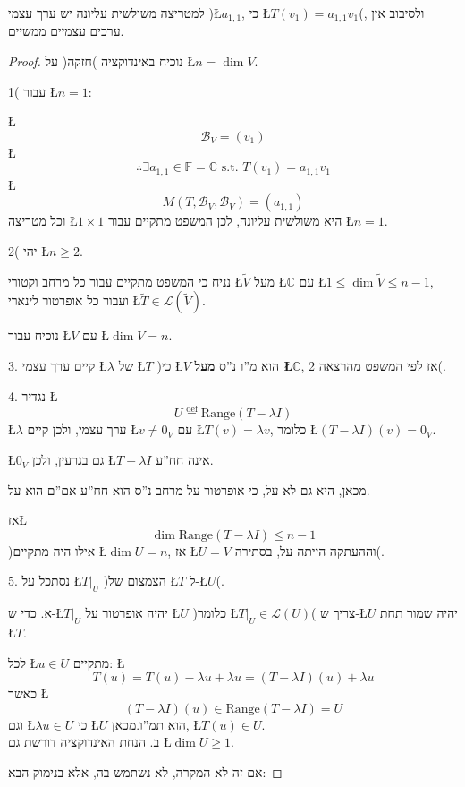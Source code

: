 \documentclass[english,hebrew]{article}
\begin{document}
למטריצה משולשית עליונה יש ערך עצמי )\L{$a_{1,1}$}, כי \L{$T(v_{1})=a_{1,1}v_{1}$}(,
ולסיבוב אין ערכים עצמיים ממשיים.
\begin{proof}
נוכיח באינדוקציה )חזקה( על \L{$n=\dim V$}.

1( עבור \L{$n=1$}:

\L{%
\[
\mathcal{B}_{V}=\left(v_{1}\right)
\]
}%
\L{%
\[
\therefore\exists a_{1,1}\in\mathbb{F}=\mathbb{C}\text{ s.t. }T(v_{1})=a_{1,1}v_{1}
\]
}%
\L{%
\[
M(T,\mathcal{B}_{V},\mathcal{B}_{V})=\left(a_{1,1}\right)
\]
}%
וכל מטריצה \L{$1\times1$} היא משולשית עליונה, לכן המשפט מתקיים עבור
\L{$n=1$}.

2( יהי \L{$n\geq2$}.

נניח כי המשפט מתקיים עבור כל מרחב וקטורי \L{$\widetilde{V}$} מעל
\L{$\mathbb{C}$} עם \L{$1\leq\dim\widetilde{V}\leq n-1$}, ועבור
כל אופרטור לינארי \L{$\widetilde{T}\in\mathcal{L}(\widetilde{V})$}.

נוכיח עבור \L{$V$} עם \L{$\dim V=n$}.

3. קיים ערך עצמי \L{$\lambda$} של \L{$T$} )כי \L{$V$} הוא מ\textquotedblright ו
נ\textquotedblright ס \textbf{מעל \L{$\mathbb{C}$}}, אז לפי המשפט
מהרצאה 2(.

4. נגדיר \L{%
\[
U\overset{\text{def}}{=}\text{Range}(T-\lambda I)
\]
}%
\L{$\lambda$} ערך עצמי, ולכן קיים \L{$v\neq0_{V}$} עם \L{$T(v)=\lambda v$},
כלומר \L{$(T-\lambda I)(v)=0_{V}$}.

\L{$0_{V}$} גם בגרעין, ולכן \L{$T-\lambda I$} אינה חח\textquotedblright ע.

מכאן, היא גם לא על, כי אופרטור על מרחב נ\textquotedblright ס הוא חח\textquotedblright ע
אם\textquotedblright ם הוא על.

אז\L{%
\[
\dim\text{Range}(T-\lambda I)\leq n-1
\]
}%
)אילו היה מתקיים \L{$\dim U=n$}, אז \L{$U=V$} וההעתקה הייתה על,
בסתירה(.

5. נסתכל על \L{$T|_{U}$} )הצמצום של \L{$T$} ל-\L{$U$}(.

א. כדי ש-\L{$T|_{U}$} יהיה אופרטור על \L{$U$} )כלומר \L{$T|_{U}\in\mathcal{L}(U)$}(
צריך ש-\L{$U$} יהיה שמור תחת \L{$T$}.

לכל \L{$u\in U$} מתקיים: \L{%
\[
T(u)=T\left(u\right)-\lambda u+\lambda u=(T-\lambda I)(u)+\lambda u
\]
}%
כאשר \L{%
\[
(T-\lambda I)(u)\in\text{Range}(T-\lambda I)=U
\]
}%
וגם \L{$\lambda u\in U$} כי \L{$U$} הוא תמ\textquotedblright ו.מכאן,
\L{$T(u)\in U$}.\\

ב. הנחת האינדוקציה דורשת גם \L{$\dim U\geq1$}.

אם זה לא המקרה, לא נשתמש בה, אלא בנימוק הבא:


\end{proof}
\end{document}

